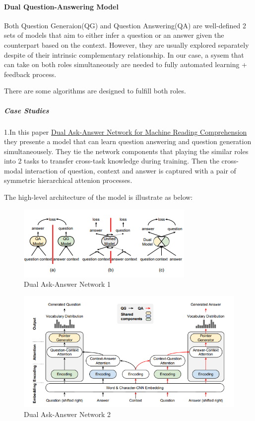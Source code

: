 \documentclass[]{book}
\let\oldparagraph\paragraph
\renewcommand{\paragraph}[1]{\oldparagraph{#1}\mbox{}}
\let\oldsubparagraph\subparagraph
\renewcommand{\subparagraph}[1]{\oldsubparagraph{#1}\mbox{}}
\theoremstyle{definition}
\theoremstyle{definition}
\theoremstyle{definition}
\theoremstyle{remark}
\begin{document}
\paragraph{Dual Question-Answering
Model}\label{dual-question-answering-model}

Both Question Generaion(QG) and Question Answering(QA) are well-defined
2 sets of models that aim to either infer a question or an answer given
the counterpart based on the context. However, they are usually explored
separately despite of their intrinsic complementary relationship. In our
case, a sysem that can take on both roles simultaneously are needed to
fully automated learning + feedback process.

There are some algorithms are designed to fulfill both roles.

\subparagraph{Case Studies}\label{case-studies-3}

1.In this paper \href{https://arxiv.org/pdf/1809.01997.pdf}{Dual
Ask-Answer Network for Machine Reading Comprehension} they presente a
model that can learn question answering and question generation
simultaneousely. They tie the network components that playing the
similar roles into 2 tasks to transfer cross-task knowledge during
training. Then the cross-modal interaction of question, context and
answer is captured with a pair of symmetric hierarchical attenion
processes.

The high-level architecture of the model is illustrate as below:

\begin{figure}
\centering
\includegraphics{img/qgqa.png}
\caption{Dual Ask-Answer Network 1}
\end{figure}

\begin{figure}
\centering
\includegraphics{img/daan.png}
\caption{Dual Ask-Answer Network 2}
\end{figure}
\end{document}
